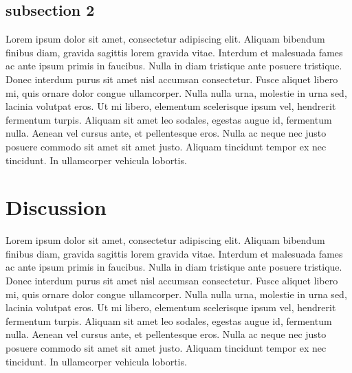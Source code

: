 \documentclass[10pt,letterpaper,twocolumn]{article}
\begin{document}
\subsection*{subsection 2}
Lorem ipsum dolor sit amet, consectetur adipiscing elit. Aliquam bibendum
finibus diam, gravida sagittis lorem gravida vitae. Interdum et malesuada fames
ac ante ipsum primis in faucibus. Nulla in diam tristique ante posuere
tristique. Donec interdum purus sit amet nisl accumsan consectetur. Fusce
aliquet libero mi, quis ornare dolor congue ullamcorper. Nulla nulla urna,
molestie in urna sed, lacinia volutpat eros. Ut mi libero, elementum scelerisque
ipsum vel, hendrerit fermentum turpis. Aliquam sit amet leo sodales, egestas
augue id, fermentum nulla. Aenean vel cursus ante, et pellentesque eros. Nulla
ac neque nec justo posuere commodo sit amet sit amet justo. Aliquam tincidunt
tempor ex nec tincidunt. In ullamcorper vehicula lobortis.

\section*{Discussion}

Lorem ipsum dolor sit amet, consectetur adipiscing elit. Aliquam bibendum
finibus diam, gravida sagittis lorem gravida vitae. Interdum et malesuada fames
ac ante ipsum primis in faucibus. Nulla in diam tristique ante posuere
tristique. Donec interdum purus sit amet nisl accumsan consectetur. Fusce
aliquet libero mi, quis ornare dolor congue ullamcorper. Nulla nulla urna,
molestie in urna sed, lacinia volutpat eros. Ut mi libero, elementum scelerisque
ipsum vel, hendrerit fermentum turpis. Aliquam sit amet leo sodales, egestas
augue id, fermentum nulla. Aenean vel cursus ante, et pellentesque eros. Nulla
ac neque nec justo posuere commodo sit amet sit amet justo. Aliquam tincidunt
tempor ex nec tincidunt. In ullamcorper vehicula lobortis.


{}
\end{document}

